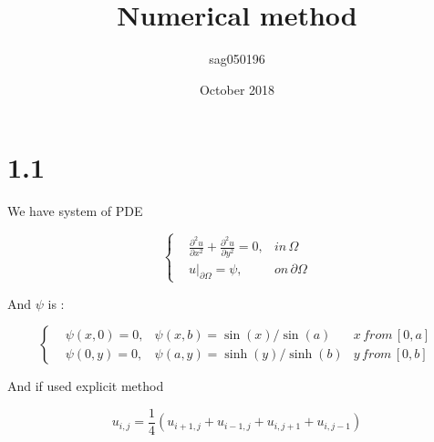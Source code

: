 \documentclass{article}
\title{Numerical method}
\author{sag050196 }
\date{October 2018}
\begin{document}
\maketitle

\section*{1.1}

We have system of PDE

\begin{equation}
    \left\{
    \begin{matrix}
    &\frac{\partial^2 u}{\partial x^2} + \frac{\partial^2 u}{\partial y^2} = 0, & in \,  \Omega \, \\
    &u|_{\partial\Omega} = \psi, & on \, \partial \Omega 
    \end{matrix}
    \right.
\end{equation}

And $\psi$ is :

\begin{equation}
\left\{
\begin{matrix}
    &\psi(x,0) = 0, & \psi(x,b) = \sin(x)/\sin(a) & x\, from\, [0,a] \\
    &\psi(0,y) = 0 , & \psi(a,y) = \sinh(y) / \sinh(b) & y\, from \, [0,b]
    \end{matrix}
    \right.
\end{equation}

And if used explicit method

\begin{equation}
    u_{i, j} = \frac{1}{4} (u_{i+1,j} + u_{i-1,j} + u_{i,j+1} + u_{i,j-1}) 
\end{equation}

\begin{figure}[h!]
\end{figure}
\end{document}
